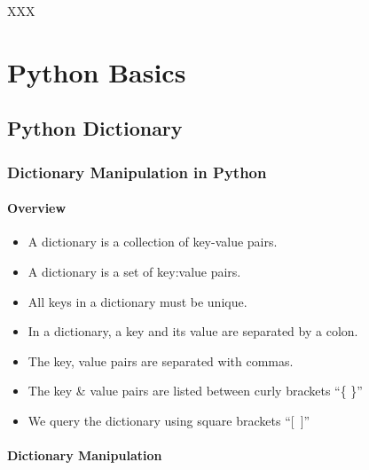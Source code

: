 \documentclass{article}
\begin{document}
XXX

\newpage
\section{Python Basics}

\subsection{Python Dictionary}
\subsubsection{Dictionary Manipulation in Python}
\paragraph{Overview}
\begin{itemize}
	\item A dictionary is a collection of key-value pairs. 

	\item A dictionary is a set of key:value pairs. 

	\item All keys in a dictionary must be unique.

	\item In a dictionary, a key and its value are separated by a colon.

	\item The key, value pairs are separated with commas.

	\item The key \& value pairs are listed between curly brackets ``\{ \}''

	\item We query the dictionary using square brackets ``[\ ]''
\end{itemize}

\paragraph{Dictionary Manipulation}
\end{document}
